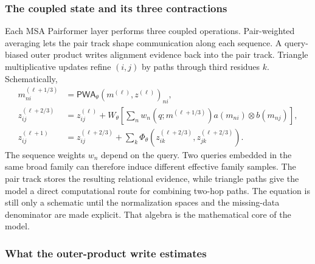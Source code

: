 \subsubsection{The coupled state and its three contractions}

Each MSA Pairformer layer performs three coupled operations.  Pair-weighted averaging lets the
pair track shape communication along each sequence.  A query-biased outer product writes
alignment evidence back into the pair track.  Triangle multiplicative updates refine $(i,j)$ by
paths through third residues $k$.  Schematically,
\begin{equation}
\begin{aligned}
m^{(\ell+1/3)}_{ni}
&=\mathsf{PWA}_{\theta}\!\left(m^{(\ell)},z^{(\ell)}\right)_{ni},\\
z^{(\ell+2/3)}_{ij}
&=z^{(\ell)}_{ij}
+W_{\theta}\!\left[
\sum_n w_n(q;m^{(\ell+1/3)})
a(m_{ni})\otimes b(m_{nj})
\right],\\
z^{(\ell+1)}_{ij}
&=z^{(\ell+2/3)}_{ij}
+\sum_k\Phi_{\theta}\!\left(z_{ik}^{(\ell+2/3)},z_{jk}^{(\ell+2/3)}\right).
\end{aligned}
\label{eq:book-msa-pairformer-layer}
\end{equation}
The sequence weights $w_n$ depend on the query.  Two queries embedded in the same broad family can
therefore induce different effective family samples.  The pair track stores the resulting
relational evidence, while triangle paths give the model a direct computational route for
combining two-hop paths.  The equation is still only a schematic until the normalization spaces
and the missing-data denominator are made explicit.  That algebra is the mathematical core of the
model.

\subsubsection{What the outer-product write estimates}

